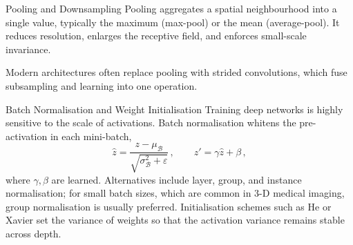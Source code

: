 \begin{frame}{Pooling and Downsampling}
    Pooling aggregates a spatial neighbourhood into a single value, typically the maximum (max-pool) or the mean (average-pool). It reduces resolution, enlarges the receptive field, and enforces small-scale invariance.
    \begin{center}
    \end{center}
    Modern architectures often replace pooling with strided convolutions, which fuse subsampling and learning into one operation.
\end{frame}

\begin{frame}{Batch Normalisation and Weight Initialisation}
    Training deep networks is highly sensitive to the scale of activations. Batch normalisation whitens the pre-activation in each mini-batch,
    \begin{equation*}
        \hat{z} = \frac{z - \mu_\mathcal{B}}{\sqrt{\sigma^2_\mathcal{B} + \varepsilon}}\,,\qquad z' = \gamma\hat{z} + \beta\,,
    \end{equation*}
    where $\gamma, \beta$ are learned. Alternatives include layer, group, and instance normalisation; for small batch sizes, which are common in 3-D medical imaging, group normalisation is usually preferred. Initialisation schemes such as He or Xavier set the variance of weights so that the activation variance remains stable across depth.
\end{frame}


